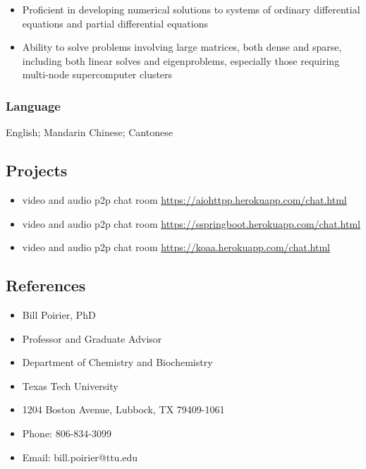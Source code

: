 \documentclass[
]{article}
\providecommand{\tightlist}{%
  \setlength{\itemsep}{0pt}\setlength{\parskip}{0pt}}
\begin{document}
\begin{itemize}
\tightlist
\item
  Proficient in developing numerical solutions to systems of ordinary
  differential equations and partial differential equations
\item
  Ability to solve problems involving large matrices, both dense and
  sparse, including both linear solves and eigenproblems, especially
  those requiring multi-node supercomputer clusters
\end{itemize}

\hypertarget{language}{%
\subsubsection{Language}\label{language}}

English; Mandarin Chinese; Cantonese

\hypertarget{projects}{%
\subsection{Projects}\label{projects}}

\begin{itemize}
\tightlist
\item
  video and audio p2p chat room
  \url{https://aiohttpp.herokuapp.com/chat.html}
\item
  video and audio p2p chat room
  \url{https://sspringboot.herokuapp.com/chat.html}
\item
  video and audio p2p chat room
  \url{https://koaa.herokuapp.com/chat.html}
\end{itemize}

\hypertarget{references}{%
\subsection{References}\label{references}}

\begin{itemize}
\tightlist
\item
  Bill Poirier, PhD
\item
  Professor and Graduate Advisor
\item
  Department of Chemistry and Biochemistry
\item
  Texas Tech University
\item
  1204 Boston Avenue, Lubbock, TX 79409-1061
\item
  Phone: 806-834-3099
\item
  Email: bill.poirier@ttu.edu
\end{itemize}
\end{document}
